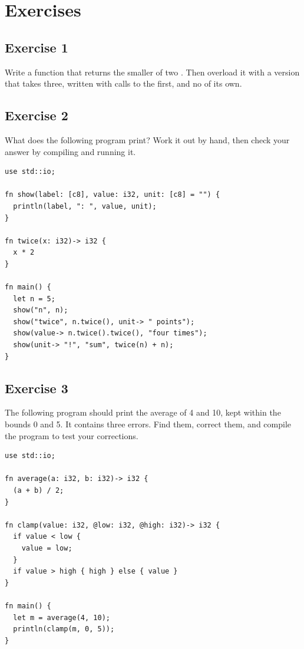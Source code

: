 \vfill%
\pagebreak

\section*{Exercises}
%
\subsection*{Exercise 1}

Write a function  that returns the smaller of two .
Then overload it with a version that takes three, written with calls to the
first, and no  of its own.

\subsection*{Exercise 2}

What does the following program print? Work it out by hand, then check your
answer by compiling and running it.

\begin{lstlisting}[style=coloredverbatim]
use std::io;

fn show(label: [c8], value: i32, unit: [c8] = "") {
  println(label, ": ", value, unit);
}

fn twice(x: i32)-> i32 {
  x * 2
}

fn main() {
  let n = 5;
  show("n", n);
  show("twice", n.twice(), unit-> " points");
  show(value-> n.twice().twice(), "four times");
  show(unit-> "!", "sum", twice(n) + n);
}
\end{lstlisting}

\subsection*{Exercise 3}

The following program should print the average of 4 and 10, kept within the
bounds 0 and 5. It contains three errors. Find them, correct them, and compile the
program to test your corrections.

\begin{lstlisting}[style=coloredverbatimError, caption=Ymir program with errors]
use std::io;

fn average(a: i32, b: i32)-> i32 {
  (a + b) / 2;
}

fn clamp(value: i32, @low: i32, @high: i32)-> i32 {
  if value < low {
    value = low;
  }
  if value > high { high } else { value }
}

fn main() {
  let m = average(4, 10);
  println(clamp(m, 0, 5));
}
\end{lstlisting}

